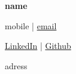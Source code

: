 
\headerfontiii

\begin{center}
    {\Huge\textbf{{{name}}}}
\end{center}
\vspace{-6mm}

\begin{center}
    \small{
    {mobile} | \href{mailto:{email}}{{email}} 
    }
\end{center}
\vspace{-6mm}

\begin{center}
    \small{
    \socialicon{\faLinkedin} \href{{linkedin}}{LinkedIn} | 
    \socialicon{\faGithub} \href{{github}}{Github}   
    }
\end{center}
\vspace{-6mm}
\begin{center}
    \small{{adress}}
\end{center}

\vspace{-4mm}
